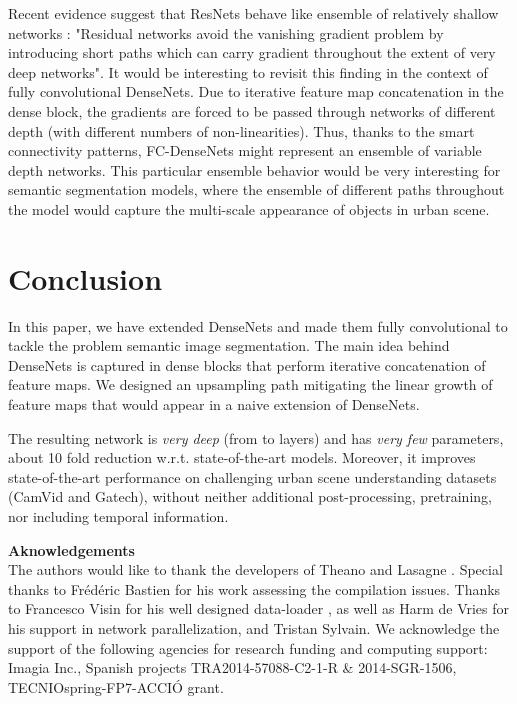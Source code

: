 \documentclass[10pt,twocolumn,letterpaper]{article}
\begin{document}
Recent evidence suggest that ResNets behave like ensemble of relatively shallow networks \cite{VeitWB16}: "Residual networks avoid the vanishing gradient problem by introducing short paths which can carry gradient throughout the extent of very deep networks". It would be interesting to revisit this finding in the context of fully convolutional DenseNets. Due to iterative feature map concatenation in the dense block, the gradients are forced to be passed through networks of different depth (with different numbers of non-linearities). Thus, thanks to the smart connectivity patterns, FC-DenseNets might represent an ensemble of variable depth networks. This particular ensemble behavior would be very interesting for semantic segmentation models, where the ensemble of different paths throughout the model would capture the multi-scale appearance of objects in urban scene.


\section{Conclusion}
In this paper, we have extended DenseNets and made them fully convolutional to tackle the problem semantic image segmentation. The main idea behind DenseNets is captured in dense blocks that perform iterative concatenation of feature maps. We designed an upsampling path mitigating the linear growth of feature maps that would appear in a naive extension of DenseNets.

The resulting network is \emph{very deep} (from  to  layers) and has \emph{very few} parameters, about 10 fold reduction w.r.t. state-of-the-art models. Moreover, it improves state-of-the-art performance on challenging urban scene understanding datasets (CamVid and Gatech), without neither additional post-processing, pretraining, nor including temporal information.

\textbf{Aknowledgements} \\

The authors would like to thank the developers of Theano \cite{Theano} and Lasagne \cite{lasagne}. Special thanks to Fr\'{e}d\'{e}ric Bastien for his work assessing the compilation issues. Thanks to Francesco Visin for his well designed data-loader \cite{Visin}, as well as Harm de Vries for his support in network parallelization, and Tristan Sylvain. We acknowledge the support of the following agencies for research funding and computing support: Imagia Inc., Spanish projects TRA2014-57088-C2-1-R \& 2014-SGR-1506, TECNIOspring-FP7-ACCIÓ grant.


{\small


}
\end{document}
